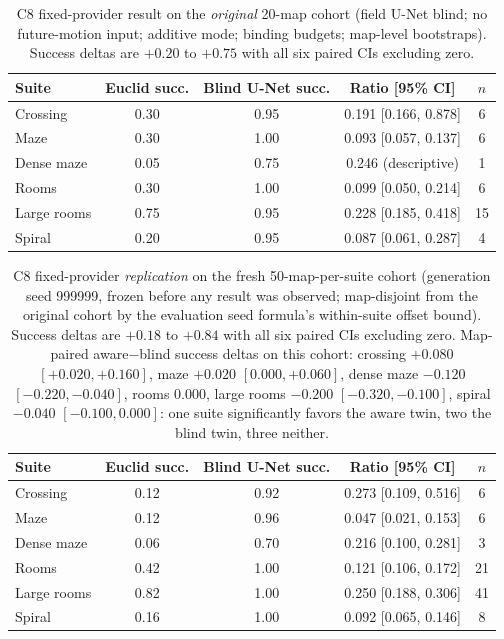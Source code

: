 \documentclass[letterpaper]{article} %
\newcommand{\stage}[1]{\textsc{#1}}
\begin{document}
\begin{table}[t]
\centering
\small
\setlength{\tabcolsep}{3pt}
\begin{tabular}{@{}lcccc@{}}
\toprule
Suite & Euclid succ. & Blind U-Net succ. & Ratio [95\% CI] & $n$ \\
\midrule
Crossing & 0.30 & 0.95 & 0.191 [0.166, 0.878] & 6 \\
Maze & 0.30 & 1.00 & 0.093 [0.057, 0.137] & 6 \\
Dense maze & 0.05 & 0.75 & 0.246 (descriptive) & 1 \\
Rooms & 0.30 & 1.00 & 0.099 [0.050, 0.214] & 6 \\
Large rooms & 0.75 & 0.95 & 0.228 [0.185, 0.418] & 15 \\
Spiral & 0.20 & 0.95 & 0.087 [0.061, 0.287] & 4 \\
\bottomrule
\end{tabular}
\caption{\stage{C8} fixed-provider result on the \emph{original} 20-map cohort (field U-Net blind; no future-motion input; additive mode; binding budgets; map-level bootstraps). Success deltas are $+0.20$ to $+0.75$ with all six paired CIs excluding zero.}
\label{tab:c8fixed}
\end{table}

\begin{table}[t]
\centering
\small
\setlength{\tabcolsep}{3pt}
\begin{tabular}{@{}lcccc@{}}
\toprule
Suite & Euclid succ. & Blind U-Net succ. & Ratio [95\% CI] & $n$ \\
\midrule
Crossing & 0.12 & 0.92 & 0.273 [0.109, 0.516] & 6 \\
Maze & 0.12 & 0.96 & 0.047 [0.021, 0.153] & 6 \\
Dense maze & 0.06 & 0.70 & 0.216 [0.100, 0.281] & 3 \\
Rooms & 0.42 & 1.00 & 0.121 [0.106, 0.172] & 21 \\
Large rooms & 0.82 & 1.00 & 0.250 [0.188, 0.306] & 41 \\
Spiral & 0.16 & 1.00 & 0.092 [0.065, 0.146] & 8 \\
\bottomrule
\end{tabular}
\caption{\stage{C8} fixed-provider \emph{replication} on the fresh 50-map-per-suite cohort (generation seed 999999, frozen before any result was observed; map-disjoint from the original cohort by the evaluation seed formula's within-suite offset bound). Success deltas are $+0.18$ to $+0.84$ with all six paired CIs excluding zero. Map-paired aware$-$blind success deltas on this cohort: crossing $+0.080$ $[+0.020,+0.160]$, maze $+0.020$ $[0.000,+0.060]$, dense maze $-0.120$ $[-0.220,-0.040]$, rooms $0.000$, large rooms $-0.200$ $[-0.320,-0.100]$, spiral $-0.040$ $[-0.100,0.000]$: one suite significantly favors the aware twin, two the blind twin, three neither.}
\label{tab:c8fresh}
\end{table}
\end{document}
